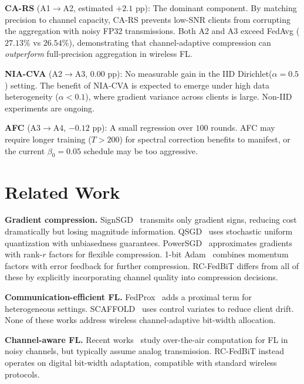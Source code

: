 \documentclass[conference]{IEEEtran}
\begin{document}
\textbf{CA-RS} (A1$\to$A2, estimated $+2.1$ pp): The dominant component. By matching precision to channel capacity, CA-RS prevents low-SNR clients from corrupting the aggregation with noisy FP32 transmissions. Both A2 and A3 exceed FedAvg ($27.13\%$ vs $26.54\%$), demonstrating that channel-adaptive compression can \emph{outperform} full-precision aggregation in wireless FL.

\textbf{NIA-CVA} (A2$\to$A3, $0.00$ pp): No measurable gain in the IID Dirichlet($\alpha{=}0.5$) setting. The benefit of NIA-CVA is expected to emerge under high data heterogeneity ($\alpha < 0.1$), where gradient variance across clients is large. Non-IID experiments are ongoing.

\textbf{AFC} (A3$\to$A4, $-0.12$ pp): A small regression over $100$ rounds. AFC may require longer training ($T > 200$) for spectral correction benefits to manifest, or the current $\beta_0 = 0.05$ schedule may be too aggressive.

\section{Related Work}

\textbf{Gradient compression.}
SignSGD~\cite{bernstein2018signsgd} transmits only gradient signs, reducing cost dramatically but losing magnitude information. QSGD~\cite{alistarh2017qsgd} uses stochastic uniform quantization with unbiasedness guarantees. PowerSGD~\cite{vogels2019powersgd} approximates gradients with rank-$r$ factors for flexible compression. 1-bit Adam~\cite{tang20211} combines momentum factors with error feedback for further compression. RC-FedBiT differs from all of these by explicitly incorporating channel quality into compression decisions.

\textbf{Communication-efficient FL.}
FedProx~\cite{li2020federated} adds a proximal term for heterogeneous settings. SCAFFOLD~\cite{karimireddy2020scaffold} uses control variates to reduce client drift. None of these works address wireless channel-adaptive bit-width allocation.

\textbf{Channel-aware FL.}
Recent works~\cite{amiri2020machine,zhu2019broadband} study over-the-air computation for FL in noisy channels, but typically assume analog transmission. RC-FedBiT instead operates on digital bit-width adaptation, compatible with standard wireless protocols.
\end{document}
